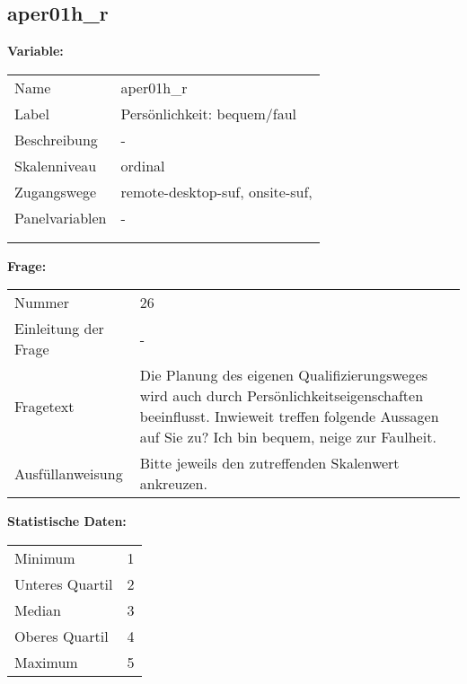 	
	
	\subsection{aper01h\_r}
	\label{subSection:aper01h_r}

	\noindent\textbf{Variable:}\\
		\begin{tabular}{lL{11.3cm}}
			\label{tableVariable:aper01h_r}
			Name & aper01h\_r \\
			Label & Persönlichkeit: bequem/faul \\
			Beschreibung & - \\
			Skalenniveau & ordinal \\
			Zugangswege &
				remote-desktop-suf,
				onsite-suf,
 \\
			Panelvariablen & -
			 \\
			 \\
 \\
		\end{tabular}

		\vspace*{1 cm}
		\noindent\textbf{Frage:}\\
		\begin{tabular}{lL{11.3cm}}
			\label{tableQuestion:aper01h_r}
			Nummer & 26 \\
			Einleitung der Frage & - \\
			Fragetext & Die Planung des eigenen Qualifizierungsweges wird auch durch Persönlichkeitseigenschaften beeinflusst. Inwieweit treffen folgende Aussagen auf Sie zu?
Ich bin bequem, neige zur Faulheit. \\
			Ausfüllanweisung & Bitte jeweils den zutreffenden
Skalenwert ankreuzen. \\
		\end{tabular}


		\vspace*{1 cm}
		\noindent\textbf{Statistische Daten:}\\
			\begin{tabular}{ll}
				\label{tableStatistics:aper01h_r}
					Minimum & 1 \\
					Unteres Quartil & 2 \\
					Median & 3 \\
					Oberes Quartil & 4 \\
					Maximum & 5 \\
			\end{tabular}



